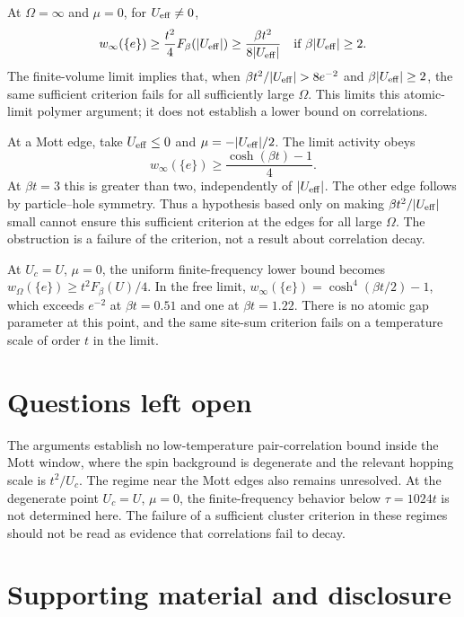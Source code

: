 \documentclass[11pt]{article}
\begin{document}
At $\Omega=\infty$ and $\mu=0$, for $U_{\rm eff}\ne0$,
\[
 w_\infty(\{e\})\ge\frac{t^2}{4}F_\beta(|U_{\rm eff}|)
 \ge\frac{\beta t^2}{8|U_{\rm eff}|}
 \quad\text{if }\beta|U_{\rm eff}|\ge2.
\]
The finite-volume limit implies that, when $\beta t^2/|U_{\rm eff}|>8e^{-2}$ and $\beta|U_{\rm eff}|\ge2$, the same sufficient criterion fails for all sufficiently large $\Omega$. This limits this atomic-limit polymer argument; it does not establish a lower bound on correlations.

At a Mott edge, take $U_{\rm eff}\le0$ and $\mu=-|U_{\rm eff}|/2$. The limit activity obeys
\[
 w_\infty(\{e\})\ge\frac{\cosh(\beta t)-1}{4}.
\]
At $\beta t=3$ this is greater than two, independently of $|U_{\rm eff}|$. The other edge follows by particle–hole symmetry. Thus a hypothesis based only on making $\beta t^2/|U_{\rm eff}|$ small cannot ensure this sufficient criterion at the edges for all large $\Omega$. The obstruction is a failure of the criterion, not a result about correlation decay.

At $U_c=U$, $\mu=0$, the uniform finite-frequency lower bound becomes $w_\Omega(\{e\})\ge t^2F_\beta(U)/4$. In the free limit, $w_\infty(\{e\})=\cosh^4(\beta t/2)-1$, which exceeds $e^{-2}$ at $\beta t=0.51$ and one at $\beta t=1.22$. There is no atomic gap parameter at this point, and the same site-sum criterion fails on a temperature scale of order $t$ in the limit.

\section{Questions left open}

The arguments establish no low-temperature pair-correlation bound inside the Mott window, where the spin background is degenerate and the relevant hopping scale is $t^2/U_c$. The regime near the Mott edges also remains unresolved. At the degenerate point $U_c=U$, $\mu=0$, the finite-frequency behavior below $\tau=1024t$ is not determined here. The failure of a sufficient cluster criterion in these regimes should not be read as evidence that correlations fail to decay.

\section*{Supporting material and disclosure}
\end{document}
